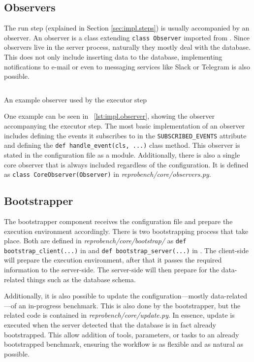 \subsection{Observers}
\label{sec:impl.observers}

The run step (explained in Section \ref{sec:impl.steps}) is usually accompanied by an observer.
An observer is a class extending \texttt{class Observer} imported from .
Since observers live in the server process, naturally they mostly deal with the database.
This does not only include inserting data to the database, implementing notifications to e-mail or even to messaging services like Slack or Telegram is also possible.

\begin{listing}
    \inputminted[firstline=7,lastline=13]{python}{assets/listings/reprobench/reprobench/executors/base.py}
    \caption{An example observer used by the executor step}
    \label{lst:impl.observer}
\end{listing}

One example can be seen in \lst~\ref{lst:impl.observer}, showing the observer accompanying the executor step.
The most basic implementation of an observer includes defining the events it subscribes to in the \texttt{SUBSCRIBED_EVENTS} attribute and defining the \texttt{def handle_event(cls, ...)} class method.
This observer is stated in the configuration file as a module.
Additionally, there is also a single core observer that is always included regardless of the configuration.
It is defined as \texttt{class CoreObserver(Observer)} in \emph{reprobench/core/observers.py}.

\subsection{Bootstrapper}

The bootstrapper component receives the configuration file and prepare the execution environment accordingly.
There is two bootstrapping process that take place.
Both are defined in \emph{reprobench/core/bootstrap/} as \texttt{def bootstrap_client(...)} in  and \texttt{def bootstrap_server(...)} in .
The client-side will prepare the execution environment, after that it passes the required information to the server-side.
The server-side will then prepare for the data-related things such as the database schema.

Additionally, it is also possible to update the configuration---mostly data-related---of an in-progress benchmark.
This is also done by the bootstrapper, but the related code is contained in \emph{reprobench/core/update.py}.
In essence, update is executed when the server detected that the database is in fact already bootstrapped.
This allow addition of tools, parameters, or tasks to an already bootstrapped benchmark, ensuring the workflow is as flexible and as natural as possible.

